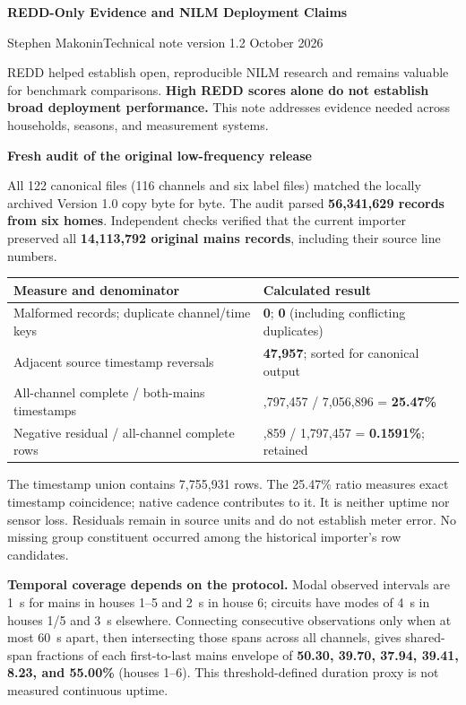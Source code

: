 \documentclass[11pt,letterpaper]{article}
\begin{document}
\fontsize{10.7}{12.2}\selectfont
{\fontsize{18}{20}\selectfont\bfseries REDD-Only Evidence and NILM Deployment Claims\par}
{\fontsize{10}{12}\selectfont Stephen Makonin\quad Technical note version 1.2 October 2026\par}
\vspace{3pt}
REDD helped establish open, reproducible NILM research and remains valuable for benchmark comparisons. \textbf{High REDD scores alone do not establish broad deployment performance.} This note addresses evidence needed across households, seasons, and measurement systems.

\textbf{Fresh audit of the original low-frequency release}

All 122 canonical files (116 channels and six label files) matched the locally archived Version 1.0 copy byte for byte. The audit parsed \textbf{56,341,629 records from six homes}. Independent checks verified that the current importer preserved all \textbf{14,113,792 original mains records}, including their source line numbers.

\begingroup\setlength{\tabcolsep}{6pt}
\begin{tabularx}{\linewidth}{|>{\raggedright\arraybackslash}p{3.00in}|>{\raggedright\arraybackslash}X|}
\hline\rowcolor{HeaderGray}\textbf{Measure and denominator} & \textbf{Calculated result}\\\hline
Malformed records; duplicate channel/time keys & \textbf{0}; \textbf{0} (including conflicting duplicates)\\\hline
Adjacent source timestamp reversals & \textbf{47,957}; sorted for canonical output\\\hline
All-channel complete / both-mains timestamps & 1,797,457 / 7,056,896 = \textbf{25.47\%}\\\hline
Negative residual / all-channel complete rows & 2,859 / 1,797,457 = \textbf{0.1591\%}; retained\\\hline
\end{tabularx}
\endgroup

The timestamp union contains 7,755,931 rows. The 25.47\% ratio measures exact timestamp coincidence; native cadence contributes to it. It is neither uptime nor sensor loss. Residuals remain in source units and do not establish meter error. No missing group constituent occurred among the historical importer's row candidates.

\textbf{Temporal coverage depends on the protocol.} Modal observed intervals are 1~s for mains in houses 1--5 and 2~s in house 6; circuits have modes of 4~s in houses 1/5 and 3~s elsewhere. Connecting consecutive observations only when at most 60~s apart, then intersecting those spans across all channels, gives shared-span fractions of each first-to-last mains envelope of \textbf{50.30, 39.70, 37.94, 39.41, 8.23, and 55.00\%} (houses 1--6). This threshold-defined duration proxy is not measured continuous uptime.
\end{document}
